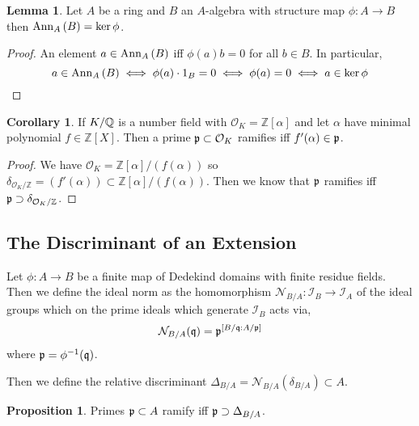 \documentclass[12pt]{extarticle}
\newcommand{\Z}{\mathbb{Z}}
\theoremstyle{definition}
\newtheorem{lemma}[theorem]{Lemma}
\newtheorem{proposition}[theorem]{Proposition}
\newtheorem{corollary}[theorem]{Corollary}
\newenvironment{definition}[1][Definition:]{\begin{trivlist}
\item[\hskip \labelsep {\bfseries #1}]}{\end{trivlist}}
\begin{document}
\begin{lemma}
Let $A$ be a ring and $B$ an $A$-algebra with structure map $\phi : A \to B$ then $\mathrm{Ann}_{A}\left( B \right) = \ker{\phi}$. 
\end{lemma}

\begin{proof}
An element $a \in \mathrm{Ann}_{A}\left( B \right)$ iff $\phi(a)b = 0$ for all $b \in B$. In particular,
\[ a \in \mathrm{Ann}_{A}\left( B \right) \iff \phi(a) \cdot 1_B = 0 \iff \phi(a) = 0 \iff a \in \ker{\phi} \]
\end{proof}
\newcommand{\ints}[1]{\mathcal{O}_{#1}}

\begin{corollary}
If $K / \mathbb{Q}$ is a number field with $\ints{K} = \Z[\alpha]$ and let $\alpha$ have minimal polynomial $f \in \Z[X]$. Then a prime $\p \subset \ints{K}$ ramifies iff $f'(\alpha) \in \mathfrak{p}$. 
\end{corollary}

\begin{proof}
We have $\ints{K} = \Z[\alpha]/(f(\alpha))$ so $\delta_{\ints{K}/\Z} = (f'(\alpha)) \subset \Z[\alpha]/(f(\alpha))$. Then we know that $\mathfrak{p}$ ramifies iff $\p \supset \delta_{\ints{K}/\Z}$. 
\end{proof}

\subsection{The Discriminant of an Extension}

\newcommand{\Norm}{\mathcal{N}}
\newcommand{\I}{\mathcal{I}}

\begin{definition}
Let $\phi : A \to B$ be a finite map of Dedekind domains with finite residue fields. Then we define the ideal norm as the homomorphism $\Norm_{B/A} : \I_{B} \to \I_{A}$ of the ideal groups which on the prime ideals which generate $\I_B$ acts via,
\[ \Norm_{B / A}(\q) = \p^{[B / \q : A / \p]} \]
where $\mathfrak{p} = \phi^{-1}(\mathfrak{q})$. 
\end{definition}


\begin{definition}
Then we define the relative discriminant $\Delta_{B/A} = \Norm_{B/A}(\delta_{B/A}) \subset A$.
\end{definition}

\begin{proposition}
Primes $\mathfrak{p} \subset A$ ramify iff $\mathfrak{p} \supset \Delta_{B / A}$. 
\end{proposition}
\end{document}
